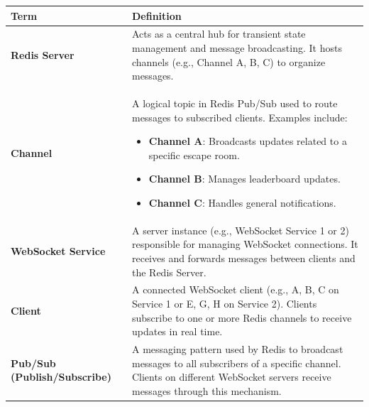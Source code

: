 \begin{longtable}{|p{4cm}|p{7.5cm}|}
\hline
\textbf{Term} & \textbf{Definition} \\ \hline
\endfirsthead
\textbf{Redis Server} & Acts as a central hub for transient state management and message broadcasting. It hosts channels (e.g., Channel A, B, C) to organize messages. \\ \hline
\textbf{Channel} & A logical topic in Redis Pub/Sub used to route messages to subscribed clients. Examples include:
\begin{itemize}
    \item \textbf{Channel A}: Broadcasts updates related to a specific escape room.
    \item \textbf{Channel B}: Manages leaderboard updates.
    \item \textbf{Channel C}: Handles general notifications.
\end{itemize} \\ \hline
\textbf{WebSocket Service} & A server instance (e.g., WebSocket Service 1 or 2) responsible for managing WebSocket connections. It receives and forwards messages between clients and the Redis Server. \\ \hline
\textbf{Client} & A connected WebSocket client (e.g., A, B, C on Service 1 or E, G, H on Service 2). Clients subscribe to one or more Redis channels to receive updates in real time. \\ \hline
\textbf{Pub/Sub (Publish/Subscribe)} & A messaging pattern used by Redis to broadcast messages to all subscribers of a specific channel. Clients on different WebSocket servers receive messages through this mechanism. \\ \hline
\end{longtable}